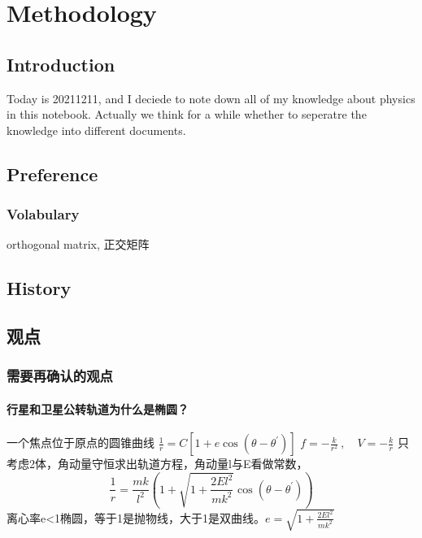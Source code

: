 


\chapter{Methodology}

\section{Introduction}
Today is 20211211, and I deciede to note down all of my knowledge about physics in this notebook. Actually we think for a while whether to seperatre the knowledge into different documents.

\section{Preference}
\subsection{Volabulary}
orthogonal matrix, 正交矩阵


\section{History}



\section{观点}

\subsection{需要再确认的观点}
\subsubsection{行星和卫星公转轨道为什么是椭圆？}

一个焦点位于原点的圆锥曲线
$\frac{1}{r}=C\left[1+e\cos(\theta-\theta^{\prime})\right]$
$f=-\frac{k}{r^{2}}~,\quad V=-\frac{k}{r}$
只考虑2体，角动量守恒求出轨道方程，角动量l与E看做常数，
$$\frac{1}{r}=\frac{mk}{l^{2}}\left(1+\sqrt{1+\frac{2El^{2}}{mk^{2}}}\cos(\theta-\theta^{\prime})\right)$$
离心率e<1椭圆，等于1是抛物线，大于1是双曲线。$e=\sqrt{1+\frac{2El^{2}}{mk^{2}}}$
